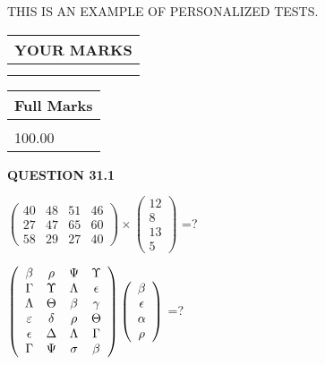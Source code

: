 \documentclass[12pt]{article}
\begin{document}
   
 \vspace{0.2in}
{\Huge  THIS IS AN EXAMPLE OF}
{\Huge  PERSONALIZED TESTS. }
   
   
  
\vspace{0.2in}
  
\noindent\begin{tabular}{|l|}
\hline
 YOUR MARKS  \\
\hline
 \\ 
 \\ 
\hline
\end{tabular}
\hspace{0.05in} \begin{tabular}{|l|}
\hline
 Full Marks  \\
\hline
 \\ 
100.00 \\
\hline
\end{tabular}
{\textbf{\Large{QUESTION
31.1 
}}}
  
  
 
$ \left( \begin{array}{ccccccccc}
 40  & 
 48  & 
 51  & 
 46  \\ 
 27  & 
 47  & 
 65  & 
 60  \\ 
 58  & 
 29  & 
 27  & 
 40
\end{array}\right) \times
\left( \begin{array}{c}
 12  \\ 
 8  \\ 
 13  \\ 
 5
\end{array}\right) $ =?
 
 
$  %
 \left( \begin{array}
 {
 c
 c
 c
 c
 }
 \beta & 
 \rho & 
 \Psi & 
 \Upsilon \\ 
 \Gamma & 
 \Upsilon & 
 \Lambda & 
 \epsilon \\ 
 \Lambda & 
 \Theta & 
 \beta & 
 \gamma \\ 
 \varepsilon & 
 \delta & 
 \rho & 
 \Theta \\ 
 \epsilon & 
 \Delta & 
 \Lambda & 
 \Gamma \\ 
 \Gamma & 
 \Psi & 
 \sigma & 
 \beta
 \end{array} \right)
 \left( \begin{array}
 {
 c
 }
 \beta \\ 
 \epsilon \\ 
 \alpha \\ 
 \rho
 \end{array} \right)
$ =?
 
\end{document}
